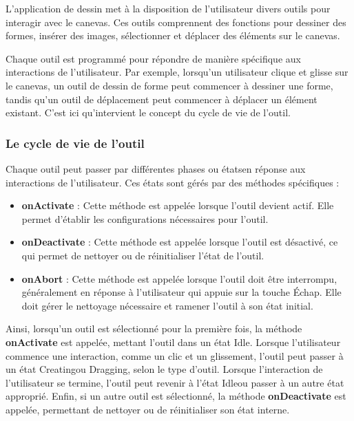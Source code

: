 L'application de dessin met à la disposition de l'utilisateur divers outils pour interagir avec le canevas. Ces outils comprennent des fonctions pour dessiner des formes, insérer des images, sélectionner et déplacer des éléments sur le canevas.

Chaque outil est programmé pour répondre de manière spécifique aux interactions de l'utilisateur. Par exemple, lorsqu'un utilisateur clique et glisse sur le canevas, un outil de dessin de forme peut commencer à dessiner une forme, tandis qu'un outil de déplacement peut commencer à déplacer un élément existant. C'est ici qu'intervient le concept du \guillemotleft cycle de vie de l'outil\guillemotright.

\subsubsection{Le cycle de vie de l'outil}

Chaque outil peut passer par différentes phases ou \guillemotleft états\guillemotright en réponse aux interactions de l'utilisateur. Ces états sont gérés par des méthodes spécifiques :

\begin{itemize}
    \item \textbf{onActivate} : Cette méthode est appelée lorsque l'outil devient actif. Elle permet d'établir les configurations nécessaires pour l'outil.
    \item \textbf{onDeactivate} : Cette méthode est appelée lorsque l'outil est désactivé, ce qui permet de nettoyer ou de réinitialiser l'état de l'outil.
    \item \textbf{onAbort} : Cette méthode est appelée lorsque l'outil doit être interrompu, généralement en réponse à l'utilisateur qui appuie sur la touche Échap. Elle doit gérer le nettoyage nécessaire et ramener l'outil à son état initial.
\end{itemize}

Ainsi, lorsqu'un outil est sélectionné pour la première fois, la méthode \textbf{onActivate} est appelée, mettant l'outil dans un état \guillemotleft Idle\guillemotright. Lorsque l'utilisateur commence une interaction, comme un clic et un glissement, l'outil peut passer à un état \guillemotleft Creating\guillemotright ou \guillemotleft Dragging\guillemotright, selon le type d'outil. Lorsque l'interaction de l'utilisateur se termine, l'outil peut revenir à l'état \guillemotleft Idle\guillemotright ou passer à un autre état approprié. Enfin, si un autre outil est sélectionné, la méthode \textbf{onDeactivate} est appelée, permettant de nettoyer ou de réinitialiser son état interne.

